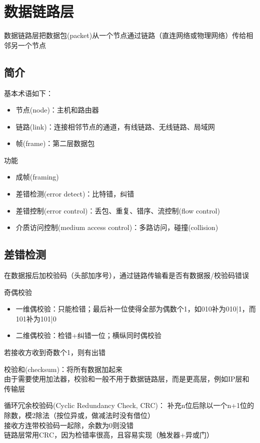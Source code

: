 
\section{数据链路层}
数据链路层把数据包(packet)从一个节点通过链路（直连网络或物理网络）传给相邻另一个节点

\subsection{简介}
基本术语如下：
\begin{itemize}
	\item 节点(node)：主机和路由器
	\item 链路(link)：连接相邻节点的通道，有线链路、无线链路、局域网
	\item 帧(frame)：第二层数据包
\end{itemize}

功能
\begin{itemize}
	\item 成帧(framing)
	\item 差错检测(error detect)：比特错，纠错
	\item 差错控制(error control)：丢包、重复、错序、流控制(flow control)
	\item 介质访问控制(medium access control)：多路访问，碰撞(collision)
\end{itemize}

\subsection{差错检测}
在数据报后加校验码（头部加序号），通过链路传输看是否有数据报/校验码错误

奇偶校验
\begin{itemize}
	\item 一维偶校验：只能检错；最后补一位使得全部为偶数个1，如010补为010|1，而101补为101|0
	\item 二维偶校验：检错+纠错一位；横纵同时偶校验
\end{itemize}
若接收方收到奇数个1，则有出错

校验和(checksum)：将所有数据加起来\\
由于需要使用加法器，校验和一般不用于数据链路层，而是更高层，例如IP层和传输层

循环冗余校验码(Cyclic Redundancy Check, CRC)：
补充n位后除以一个n+1位的除数，模2除法（按位异或，做减法时没有借位）\\
接收方连带校验码一起除，余数为0则没错\\
链路层常用CRC，因为检错率很高，且容易实现（触发器+异或门）

